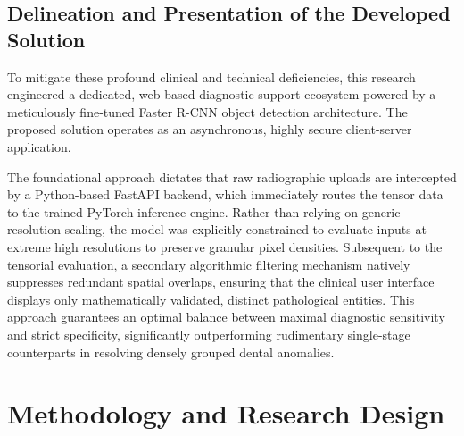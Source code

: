\subsection{Delineation and Presentation of the Developed Solution}
\par To mitigate these profound clinical and technical deficiencies, this research engineered a dedicated, web-based diagnostic support ecosystem powered by a meticulously fine-tuned Faster R-CNN object detection architecture. The proposed solution operates as an asynchronous, highly secure client-server application. 
\par The foundational approach dictates that raw radiographic uploads are intercepted by a Python-based FastAPI backend, which immediately routes the tensor data to the trained PyTorch inference engine. Rather than relying on generic resolution scaling, the model was explicitly constrained to evaluate inputs at extreme high resolutions to preserve granular pixel densities. Subsequent to the tensorial evaluation, a secondary algorithmic filtering mechanism natively suppresses redundant spatial overlaps, ensuring that the clinical user interface displays only mathematically validated, distinct pathological entities. This approach guarantees an optimal balance between maximal diagnostic sensitivity and strict specificity, significantly outperforming rudimentary single-stage counterparts in resolving densely grouped dental anomalies.

\section{Methodology and Research Design}
\label{sec:ch4_methodology}

